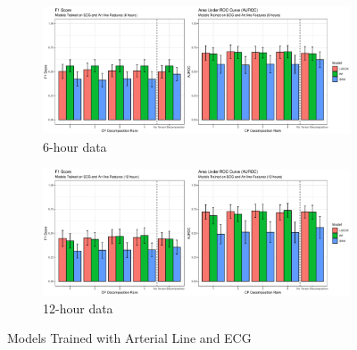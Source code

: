 \begin{figure}[htb]
    \centering
    \begin{subfigure}[htb]{\textwidth}
        \includegraphics[width=\textwidth]{body/figures/both_6.eps}
        \caption{6-hour data}
    \end{subfigure}
    \hfill
    \begin{subfigure}[htb]{\textwidth}
        \includegraphics[width=\textwidth]{body/figures/both_12.eps}
        \caption{12-hour data}
    \end{subfigure}
    \caption{Models Trained with Arterial Line and ECG}
    \label{fig:sigonly}
\end{figure}  %

